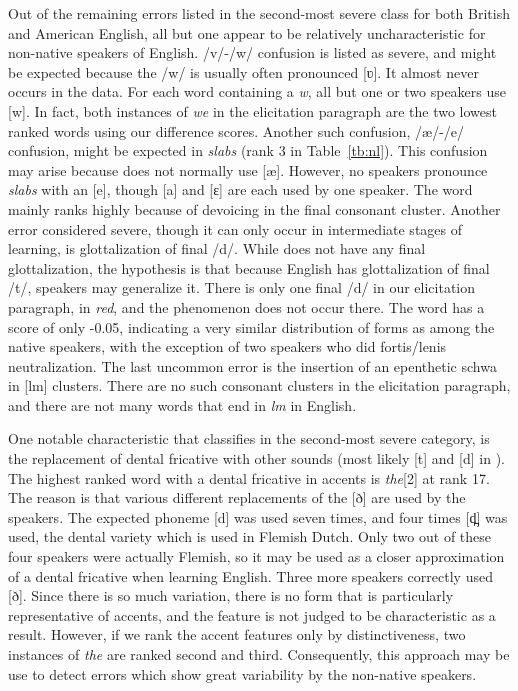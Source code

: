 \documentclass[output=paper]{LSP/langsci}
\begin{document}
Out of the remaining errors listed in the second-most severe class for both British and American English, all but one appear to be relatively uncharacteristic for  non-native speakers of English. /v/-/w/ confusion is listed as severe, and might be expected because the  /w/ is usually often pronounced 
[ʋ]. It almost never occurs in the data. For each word containing a \textit{w}, all but one or two  speakers use [w]. In fact, both instances of \textit{we} in the elicitation paragraph are the two lowest ranked words using our difference scores. Another such confusion, /æ/-/e/ confusion, might be expected in \textit{slabs} (rank 3 in Table~\ref{tb:nl}). This confusion may arise because  does not normally use [æ]. However, no  speakers pronounce \textit{slabs} with an [e], though [a] and [ɛ] are each used by one speaker. The word mainly ranks highly because of devoicing in the final consonant cluster. Another error considered severe, though it can only occur in intermediate stages of learning, is glottalization of final /d/. While  does not have any final glottalization, the hypothesis is that because English has glottalization of final /t/,  speakers may generalize it. There is only one final /d/ in our elicitation paragraph, in \textit{red}, and the phenomenon does not occur there. The word has a score of only -0.05, indicating a very similar distribution of forms as among the native speakers, with the exception of two speakers who did fortis/lenis neutralization. The last uncommon error is the insertion of an epenthetic schwa in [lm] clusters. There are no such consonant clusters in the elicitation paragraph, and there are not many words that end in \textit{lm} in English.

\largerpage 
One notable characteristic that \citet{van_den_doel_evaluation_2006} classifies in the second-most severe category, is the replacement of dental fricative with other sounds (most likely [t] and [d] in ). The highest ranked word with a dental fricative in  accents is \textit{the}[2] at rank 17. The reason is that various different replacements of the 
[ð] are used by the  speakers. The expected phoneme [d] was used seven times, and four times [d̪] was used, the dental variety which is used in Flemish Dutch. Only two out of these four speakers were actually Flemish, so it may be used as a closer approximation of a dental fricative when learning English. Three more speakers correctly used [ð].
Since there is so much variation, there is no form that is particularly representative of  accents, and the feature is not judged to be characteristic as a result. However, if we rank the  accent features only by distinctiveness, two instances of \textit{the} are ranked second and third. Consequently, this approach may be use to detect errors which show great variability by the non-native speakers.
\end{document}
